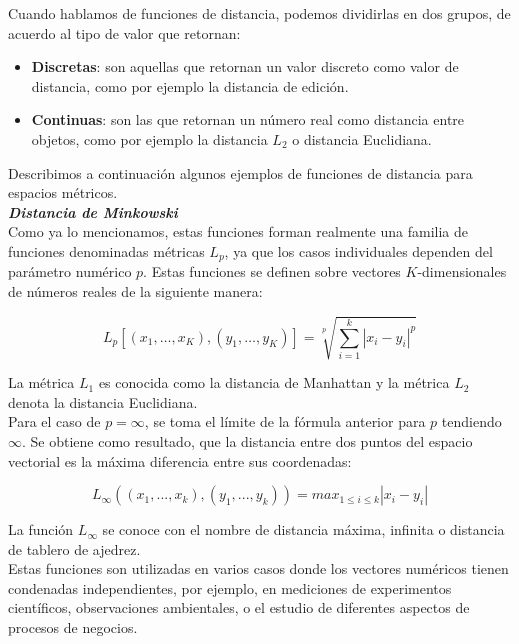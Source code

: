 Cuando hablamos de funciones de distancia, podemos dividirlas en dos grupos, de acuerdo
 al tipo de valor que retornan:\\

\begin{itemize}
\item \textbf{Discretas}: son  aquellas que retornan un valor discreto como valor de 
distancia, como por ejemplo la distancia de edici\'on.

\item \textbf{Continuas}: son las que retornan un n\'umero real como distancia entre
objetos, como por ejemplo la distancia $L_2$ o distancia Euclidiana.

\end{itemize}


Describimos a continuaci\'on algunos ejemplos de funciones de distancia para
espacios m\'etricos. \\

\noindent \textbf{\textit{Distancia de Minkowski}} \\

Como ya lo mencionamos, estas funciones forman realmente una familia de 
funciones denominadas m\'etricas $L_p$, ya que los 
casos individuales dependen del par\'ametro num\'erico $p$. Estas funciones se definen sobre 
vectores $K$-dimensionales de n\'umeros reales de la siguiente manera:

\[
L_p[(x_1,\ldots,x_K),(y_1,\ldots,y_K)] = \sqrt[p]{ \sum_{i=1}^k|x_i - y_i|^p}
\]

La m\'etrica $L_1$ es conocida como la distancia de Manhattan y la m\'etrica
 $L_2$ denota la distancia Euclidiana.\\
Para el caso de $p=\infty$, se toma el l\'imite de la f\'ormula anterior para $p$ tendiendo $
\infty$. Se obtiene como resultado, que la distancia entre dos puntos del espacio vectorial es la 
m\'axima diferencia entre sus coordenadas:

\[
L_{\infty}((x_1,...,x_k), (y_1,...,y_k)) = max_{1 \leq i \leq k} |x_i - y_i |
\]

 
 La funci\'on $L_{\infty}$ se conoce con el nombre de  distancia m\'axima, infinita o distancia de tablero de ajedrez.\\

Estas funciones son utilizadas en varios casos donde los vectores num\'ericos 
tienen condenadas independientes, por ejemplo, en mediciones de experimentos cient\'ificos, observaciones ambientales, o el estudio de diferentes aspectos de procesos de negocios.\\

